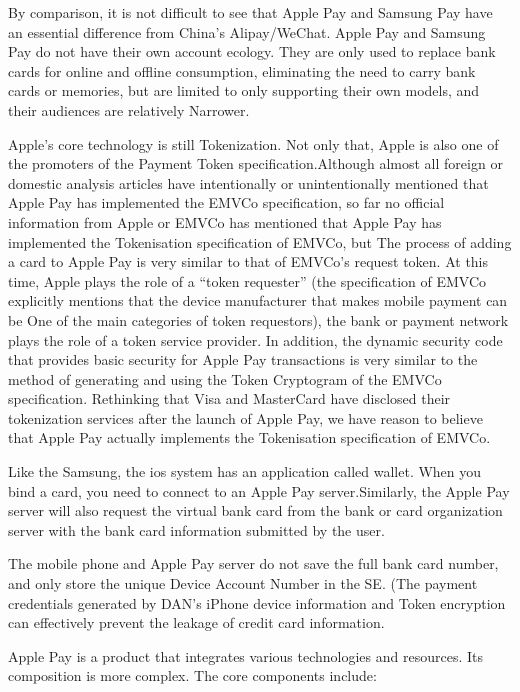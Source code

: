 \documentclass[journal]{IEEEtran}
\begin{document}
By comparison, it is not difficult to see that Apple Pay and Samsung Pay have an essential difference from China’s Alipay/WeChat. Apple Pay and Samsung Pay do not have their own account ecology. They are only used to replace bank cards for online and offline consumption, eliminating the need to carry bank cards or memories, but are limited to only supporting their own models, and their audiences are relatively Narrower.

Apple's core technology is still Tokenization. Not only that, Apple is also one of the promoters of the Payment Token specification.Although almost all foreign or domestic analysis articles have intentionally or unintentionally mentioned that Apple Pay has implemented the EMVCo specification, so far no official information from Apple or EMVCo has mentioned that Apple Pay has implemented the Tokenisation specification of EMVCo, but The process of adding a card to Apple Pay is very similar to that of EMVCo's request token. At this time, Apple plays the role of a “token requester” (the specification of EMVCo explicitly mentions that the device manufacturer that makes mobile payment can be One of the main categories of token requestors), the bank or payment network plays the role of a token service provider. In addition, the dynamic security code that provides basic security for Apple Pay transactions is very similar to the method of generating and using the Token Cryptogram of the EMVCo specification. Rethinking that Visa and MasterCard have disclosed their tokenization services after the launch of Apple Pay, we have reason to believe that Apple Pay actually implements the Tokenisation specification of EMVCo.

Like the Samsung, the ios system has an application called wallet. When you bind a card, you need to connect to an Apple Pay server.Similarly, the Apple Pay server will also request the virtual bank card from the bank or card organization server with the bank card information submitted by the user.

The mobile phone and Apple Pay server do not save the full bank card number, and only store the unique Device Account Number in the SE. (The payment credentials generated by DAN's iPhone device information and Token encryption can effectively prevent the leakage of credit card information.

Apple Pay is a product that integrates various technologies and resources. Its composition is more complex. The core components include:
\end{document}
